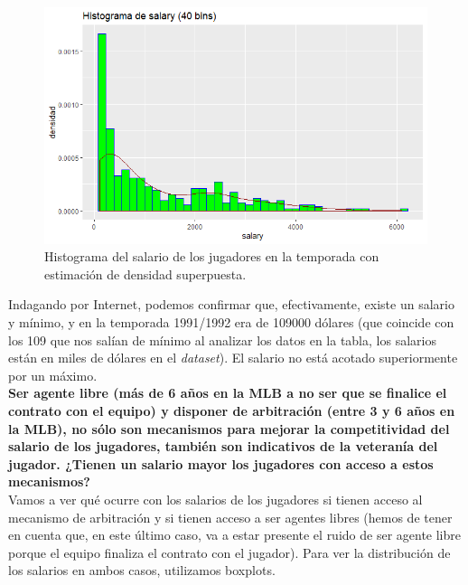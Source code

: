 \documentclass[a4paper,12pt, oneside]{book}
\begin{document}
\begin{figure}[H]
\centering
\includegraphics[scale=0.7]{images/salary.png}
\caption{Histograma del salario de los jugadores en la temporada con estimación de densidad superpuesta.}
\label{homerunsalary}
\end{figure}

Indagando por Internet, podemos confirmar que, efectivamente, existe un salario y mínimo, y en la temporada 1991/1992 era de 109000 dólares (que coincide con los 109 que nos salían de mínimo al analizar los datos en la tabla, los salarios están en miles de dólares en el \textit{dataset}). El salario no está acotado superiormente por un máximo.\\




\textbf{Ser agente libre (más de 6 años en la MLB a no ser que se finalice el contrato con el equipo) y disponer de arbitración (entre 3 y 6 años en la MLB), no sólo son mecanismos para mejorar la competitividad del salario de los jugadores, también son indicativos de la veteranía del jugador. ¿Tienen un salario mayor los jugadores con acceso a estos mecanismos?}\\

Vamos a ver qué ocurre con los salarios de los jugadores si tienen acceso al mecanismo de arbitración y si tienen acceso a ser agentes libres (hemos de tener en cuenta que, en este último caso, va a estar presente el ruido de ser agente libre porque el equipo finaliza el contrato con el jugador). Para ver la distribución de los salarios en ambos casos, utilizamos boxplots.
\end{document}
